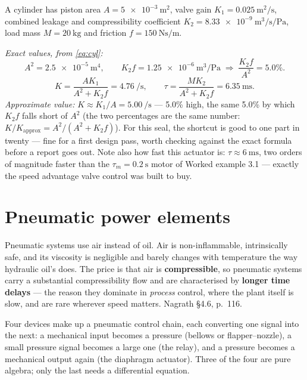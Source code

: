 \documentclass[11pt,a4paper]{article}
\begin{document}
\begin{workedex}[breakable, title={Worked example 4.1 --- how good is $K\approx K_{1}/A$?}]
A cylinder has piston area $A=\SI{5e-3}{\metre\squared}$, valve gain
$K_{1}=\SI{0.025}{\metre\squared\per\second}$, combined leakage and
compressibility coefficient
$K_{2}=\SI{8.33e-9}{\metre\cubed\per\second\per\pascal}$, load mass
$M=\SI{20}{\kilo\gram}$ and friction $f=\SI{150}{\newton\second\per\metre}$.

\emph{Exact values, from \eqref{eq:cyl}:}
\[
  A^{2}=\SI{2.5e-5}{\metre\tothe{4}}, \qquad
  K_{2}f=\SI{1.25e-6}{\metre\cubed\per\pascal}
  \;\Longrightarrow\; \frac{K_{2}f}{A^{2}}=5.0\%.
\]
\[
  K=\frac{AK_{1}}{A^{2}+K_{2}f}=\SI{4.76}{\per\second},
  \qquad
  \tau=\frac{MK_{2}}{A^{2}+K_{2}f}=\SI{6.35}{\milli\second}.
\]
\emph{Approximate value:} $K\approx K_{1}/A=\SI{5.00}{\per\second}$ --- 5.0\%
high, the same 5.0\% by which $K_{2}f$ falls short of $A^{2}$ (the two
percentages are the same number: $K/K_{\text{approx}}=A^{2}/(A^{2}+K_{2}f)$).
For this seal, the shortcut is good to one part in twenty --- fine for a
first design pass, worth checking against the exact formula before a report
goes out. Note also how fast this actuator is: $\tau\approx\SI{6}{\milli
\second}$, two orders of magnitude faster than the $\tau_{m}=\SI{0.2}{\second}$
motor of Worked example 3.1 --- exactly the speed advantage valve control was
built to buy.
\end{workedex}

\section{Pneumatic power elements}
\label{sec:pneumatics}

Pneumatic systems use air instead of oil. Air is non-inflammable,
intrinsically safe, and its viscosity is negligible and barely changes with
temperature the way hydraulic oil's does. The price is that air is
\textbf{compressible}, so pneumatic systems carry a substantial compressibility
flow and are characterised by \textbf{longer time delays} --- the reason they
dominate in \emph{process} control, where the plant itself is slow, and are
rare wherever speed matters. Nagrath \S4.6, p.~116.

Four devices make up a pneumatic control chain, each converting one signal
into the next: a mechanical input becomes a pressure (bellows or
flapper--nozzle), a small pressure signal becomes a large one (the relay),
and a pressure becomes a mechanical output again (the diaphragm actuator).
Three of the four are pure algebra; only the last needs a differential
equation.
\end{document}
